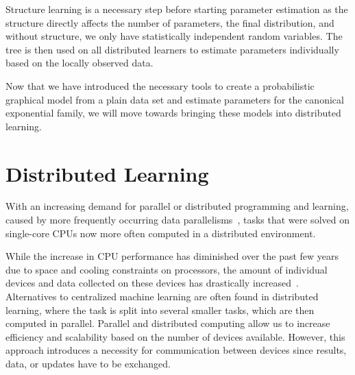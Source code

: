 Structure learning is a necessary step before starting parameter estimation as the structure directly affects the number of parameters, the final distribution, and without structure, we only have statistically independent random variables. 
The tree is then used on all distributed learners to estimate parameters individually based on the locally observed data. 

Now that we have introduced the necessary tools to create a probabilistic graphical model from a plain data set and estimate parameters for the canonical exponential family, we will move towards bringing these models into distributed learning.


\section{Distributed Learning}
With an increasing demand for parallel or distributed programming and learning, caused by more frequently occurring data parallelisms~\cite{ben2006principles}, tasks that were solved on single-core CPUs now more often computed in a distributed environment.

While the increase in CPU performance has diminished over the past few years~\cite{herlihy2011art} due to space and cooling constraints on processors, the amount of individual devices and data collected on these devices has drastically increased~\cite{kaisler2013big}.
Alternatives to centralized machine learning are often found in distributed learning, where the task is split into several smaller tasks, which are then computed in parallel. 
Parallel and distributed computing allow us to increase efficiency and scalability based on the number of devices available.
However, this approach introduces a necessity for communication between devices since results, data, or updates have to be exchanged.

